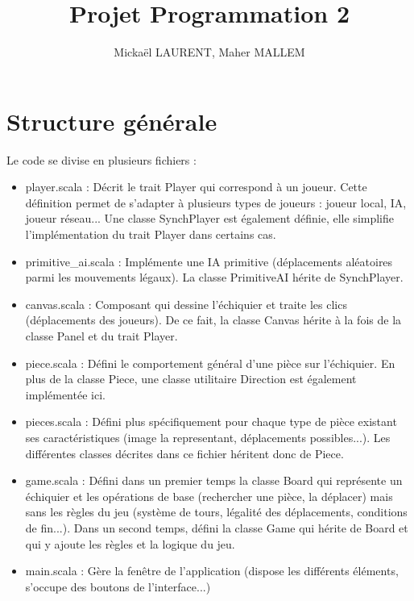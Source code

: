 \documentclass[11pt]{article}
\title{Projet Programmation 2}
\author{Mickaël LAURENT, Maher MALLEM}
\date{}
\begin{document}
\renewcommand{\labelitemi}{-}
\maketitle

\section{Structure générale}

Le code se divise en plusieurs fichiers :\newline
\begin{itemize}
\item player.scala : Décrit le trait Player qui correspond à un joueur. Cette définition permet de s'adapter à plusieurs types de joueurs : joueur local, IA, joueur réseau... Une classe SynchPlayer est également définie, elle simplifie l'implémentation du trait Player dans certains cas.\newline

\item primitive\_ai.scala : Implémente une IA primitive (déplacements aléatoires parmi les mouvements légaux). La classe PrimitiveAI hérite de SynchPlayer.\newline

\item canvas.scala : Composant qui dessine l'échiquier et traite les clics (déplacements des joueurs). De ce fait, la classe Canvas hérite à la fois de la classe Panel et du trait Player.\newline

\item piece.scala : Défini le comportement général d'une pièce sur l'échiquier. En plus de la classe Piece, une classe utilitaire Direction est également implémentée ici.\newline

\item pieces.scala : Défini plus spécifiquement pour chaque type de pièce existant ses caractéristiques (image la representant, déplacements possibles...). Les différentes classes décrites dans ce fichier héritent donc de Piece.\newline

\item game.scala : Défini dans un premier temps la classe Board qui représente un échiquier et les opérations de base (rechercher une pièce, la déplacer) mais sans les règles du jeu (système de tours, légalité des déplacements, conditions de fin...). Dans un second temps, défini la classe Game qui hérite de Board et qui y ajoute les règles et la logique du jeu.\newline

\item main.scala : Gère la fenêtre de l'application (dispose les différents éléments, s'occupe des boutons de l'interface...)
\end{itemize}
\-
\end{document}
